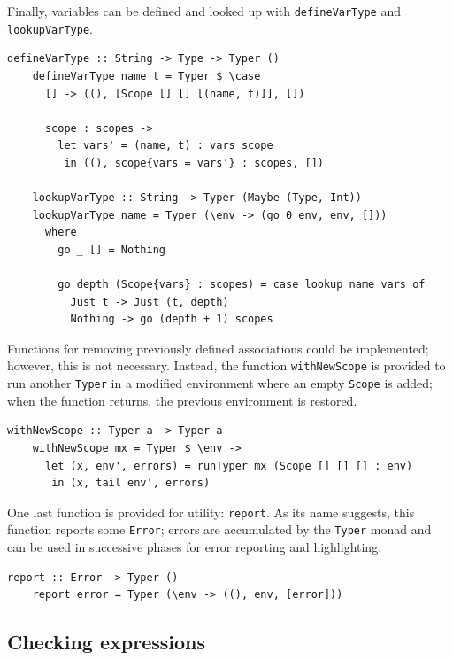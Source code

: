 \documentclass[UdineBachThesis,american,11pt]{PhdThesis}
\begin{document}
  Finally, variables can be defined and looked up with
  \mbox{\texttt{defineVarType}} and \mbox{\texttt{lookupVarType}}.

  \begin{Verbatim}[gobble=4,fontsize=\small]
    defineVarType :: String -> Type -> Typer ()
    defineVarType name t = Typer $ \case
      [] -> ((), [Scope [] [] [(name, t)]], [])

      scope : scopes ->
        let vars' = (name, t) : vars scope
         in ((), scope{vars = vars'} : scopes, [])

    lookupVarType :: String -> Typer (Maybe (Type, Int))
    lookupVarType name = Typer (\env -> (go 0 env, env, []))
      where
        go _ [] = Nothing

        go depth (Scope{vars} : scopes) = case lookup name vars of
          Just t -> Just (t, depth)
          Nothing -> go (depth + 1) scopes
  \end{Verbatim}

  Functions for removing previously defined associations could be implemented;
  however, this is not necessary. Instead, the function
  \mbox{\texttt{withNewScope}} is provided to run another \mbox{\texttt{Typer}}
  in a modified environment where an empty \mbox{\texttt{Scope}} is added; when
  the function returns, the previous environment is restored.

  \begin{Verbatim}[gobble=4,fontsize=\small]
    withNewScope :: Typer a -> Typer a
    withNewScope mx = Typer $ \env ->
      let (x, env', errors) = runTyper mx (Scope [] [] [] : env)
       in (x, tail env', errors)
  \end{Verbatim}

  One last function is provided for utility: \mbox{\texttt{report}}. As its name
  suggests, this function reports some \mbox{\texttt{Error}}; errors are
  accumulated by the \mbox{\texttt{Typer}} monad and can be used in successive
  phases for error reporting and highlighting.

  \begin{Verbatim}[gobble=4,fontsize=\small]
    report :: Error -> Typer ()
    report error = Typer (\env -> ((), env, [error]))
  \end{Verbatim}

  \newpage

  \subsection{Checking expressions}
\end{document}

